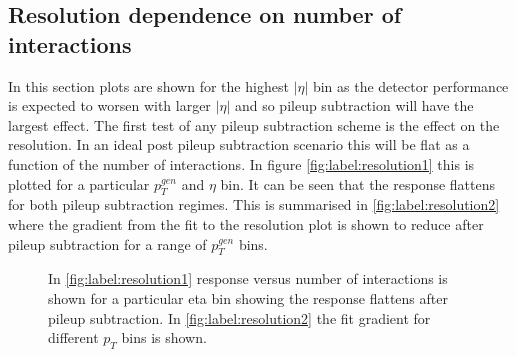 \subsection{Resolution dependence on number of interactions}
In this section plots are shown for the highest $|\eta|$ bin as the detector performance is expected to worsen with larger $|\eta|$ and so pileup subtraction will have the largest effect. The first test of any pileup subtraction scheme is the effect on the resolution. In an ideal post pileup subtraction scenario this will be flat as a function of the number of interactions. In figure \ref{fig:label:resolution1} this is plotted for a particular $p^{gen}_T$ and $\eta$ bin. It can be seen that the response flattens for both pileup subtraction regimes. This is summarised in \ref{fig:label:resolution2} where the gradient from the fit to the resolution plot is shown to reduce after pileup subtraction for a range of $p^{gen}_T$ bins.  
\begin{figure}
\hfill
{}
\hfill
{}
\caption{In \ref{fig:label:resolution1} response versus number of interactions is shown for a particular eta bin showing the response flattens after pileup subtraction. In \ref{fig:label:resolution2} the fit gradient for different $p_{T}$ bins is shown.}
\label{fig:label:resolution}
\end{figure}
